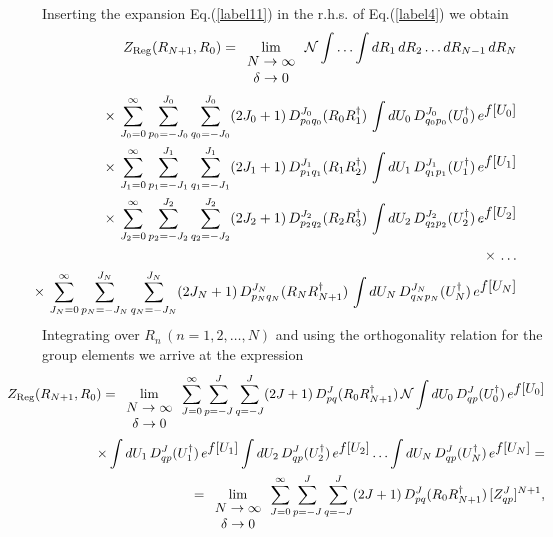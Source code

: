 \documentclass[a4paper,11pt]{article}
\begin{document}
Inserting the expansion Eq.(\ref{label11}) in the r.h.s. of
Eq.(\ref{label4}) we obtain
%
\begin{eqnarray}\label{label16}
\hspace{-0.5in}&&Z_{\rm Reg}(R_{N+1},R_0) = \lim_{\begin{array}{c}
N\to \infty\\ \delta \to 0\end{array}}{\cal N}\int\ldots\int
dR_1\,dR_2\ldots dR_{N-1}\,dR_N\nonumber\\
\hspace{-0.5in}&&\times\,\sum^{\infty}_{J_0=0}
\sum^{J_0}_{p_0=-J_0}\sum^{J_0}_{q_0=-J_0}(2J_0
+ 1)\,D^{J_0}_{p_0q_0}(R_0R^{\dagger}_1)\, \int
dU_0\,D^{J_0}_{q_0p_0}(U^{\dagger}_0)\,e^{\textstyle
f[U_0]}\nonumber\\
\hspace{-0.5in}&&\times\,\sum^{\infty}_{J_1=0}
\sum^{J_1}_{p_1=-J_1}\sum^{J_1}_{q_1=-J_1}(2J_1
+ 1)\,D^{J_1}_{p_1q_1}(R_1R^{\dagger}_2)\, \int
dU_1\,D^{J_1}_{q_1p_1}(U^{\dagger}_1)\,e^{\textstyle
f[U_1]}\nonumber\\
\hspace{-0.5in}&&\times\,\sum^{\infty}_{J_2=0}
\sum^{J_2}_{p_2=-J_2}\sum^{J_2}_{q_2=-J_2}(2J_2 + 1)
\,D^{J_2}_{p_2q_2}(R_2R^{\dagger}_3)\, \int
dU_2\,D^{J_2}_{q_2p_2}(U^{\dagger}_2)\,e^{\textstyle
f[U_2]}\nonumber\\ \hspace{-0.5in}&&\times\,\ldots\nonumber\\
\hspace{-0.5in}&&\times\,\sum^{\infty}_{J_N=0} \sum^{J_N}_{p_N
=-J_N}\sum^{J_N}_{q_N =-J_N}(2J_N +
1)\,D^{J_N}_{p_Nq_N}(R_NR^{\dagger}_{N+1})\, \int
dU_N\,D^{J_N}_{q_Np_N}(U^{\dagger}_N)\,e^{\textstyle f[U_N]}
\end{eqnarray}
%
Integrating over $R_n\,(n=1,2,\ldots,N)$ and using the
orthogonality relation for the group elements we arrive at the
expression
%
\begin{eqnarray}\label{label17}
\hspace{-0.5in}&&Z_{\rm Reg}(R_{N+1},R_0) = \lim_{\begin{array}{c}
N\to \infty\\ \delta \to 0\end{array}}
\sum^{\infty}_{J=0}\sum^{J}_{p=-J}\sum^{J}_{q=-J}(2J +
1)\,D^J_{pq}(R_0R^{\dagger}_{N+1})\,{\cal N}\int
dU_0\,D^J_{qp}(U^{\dagger}_0)\,e^{\textstyle
f[U_0]}\nonumber\\
\hspace{-0.5in}&&\times \int
dU_1\,D^J_{qp}(U^{\dagger}_1)\,e^{\textstyle f[U_1]}\int
dU_2\,D^J_{qp}(U^{\dagger}_2)\,e^{\textstyle f[U_2]}\ldots\int
dU_N\,D^J_{qp}(U^{\dagger}_N)\,e^{\textstyle f[U_N]}=\nonumber\\
\hspace{-0.5in}&&=\lim_{\begin{array}{c} N\to \infty\\ \delta \to
0\end{array}}\sum^{\infty}_{J=0}\sum^{J}_{p=-J}
\sum^{J}_{q=-J}(2J + 1)\,D^J_{pq}(R_0R^{\dagger}_{N+1})\,[Z^J_{qp}]^{N+1},
\end{eqnarray}
\end{document}
